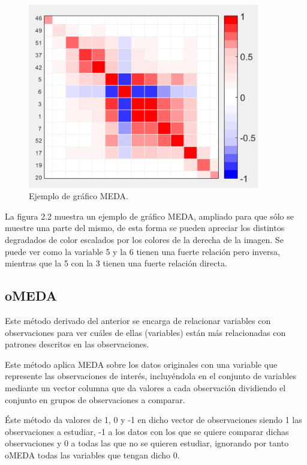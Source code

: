 \begin{figure}[H]
\centering
\includegraphics[width=0.9\textwidth]{imagenes/figuras/2_3.png}
\caption{Ejemplo de gráfico MEDA.}
\end{figure}

La figura 2.2 muestra un ejemplo de gráfico MEDA,  ampliado para que sólo se muestre una parte del mismo, de esta forma se pueden apreciar los distintos degradados de color escalados por los colores de la derecha de la imagen. Se puede ver como la variable 5 y la 6 tienen una fuerte relación pero inversa, mientras que la 5 con la 3 tienen una fuerte relación directa.

\bigskip

\subsection{oMEDA}

Este método derivado del anterior se encarga de relacionar variables con observaciones para ver cuáles de ellas (variables) están más relacionadas con patrones descritos en las observaciones.
\bigskip

Este método aplica MEDA sobre los datos originales con una variable que represente las observaciones de interés, incluyéndola en el conjunto de variables mediante un vector columna que da valores a cada observación dividiendo el conjunto en grupos de observaciones a comparar.
\bigskip

Éste método da valores de 1, 0 y -1 en dicho vector de observaciones siendo 1 las observaciones a estudiar, -1 a los datos con los que se quiere comparar dichas observaciones y 0 a todas las que no se quieren estudiar, ignorando por tanto oMEDA todas las variables que tengan dicho 0.
\bigskip


